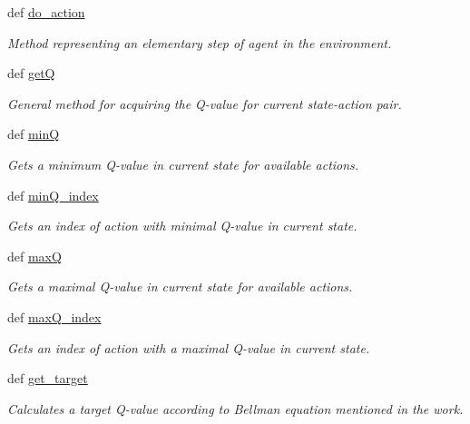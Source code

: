 \begin{DoxyCompactItemize}
def \hyperlink{class_n_f_q_1_1_n_f_q_a059828e7afb0a89671ef08f9f9e8c12e}{do\+\_\+action}
\begin{DoxyCompactList}\small\item\em Method representing an elementary step of agent in the environment. \end{DoxyCompactList}\item 
def \hyperlink{class_n_f_q_1_1_n_f_q_aecbff2e71eacc518b89558411e9c4e2a}{get\+Q}
\begin{DoxyCompactList}\small\item\em General method for acquiring the Q-\/value for current state-\/action pair. \end{DoxyCompactList}\item 
def \hyperlink{class_n_f_q_1_1_n_f_q_a3bb0ca0e6444e78d72f843ea687fec56}{min\+Q}
\begin{DoxyCompactList}\small\item\em Gets a minimum Q-\/value in current state for available actions. \end{DoxyCompactList}\item 
def \hyperlink{class_n_f_q_1_1_n_f_q_a5eb62d0f60ade3959535d6c96d9de3c6}{min\+Q\+\_\+index}
\begin{DoxyCompactList}\small\item\em Gets an index of action with minimal Q-\/value in current state. \end{DoxyCompactList}\item 
def \hyperlink{class_n_f_q_1_1_n_f_q_a594aeec3e63750a0d60dc75c883e5412}{max\+Q}
\begin{DoxyCompactList}\small\item\em Gets a maximal Q-\/value in current state for available actions. \end{DoxyCompactList}\item 
def \hyperlink{class_n_f_q_1_1_n_f_q_a73a9b088ceb7051798debf8fa69b148f}{max\+Q\+\_\+index}
\begin{DoxyCompactList}\small\item\em Gets an index of action with a maximal Q-\/value in current state. \end{DoxyCompactList}\item 
def \hyperlink{class_n_f_q_1_1_n_f_q_a009c94bdd435c7a379adda4f47ba7da0}{get\+\_\+target}
\begin{DoxyCompactList}\small\item\em Calculates a target Q-\/value according to Bellman equation mentioned in the work. \end{DoxyCompactList}\end{DoxyCompactItemize}
